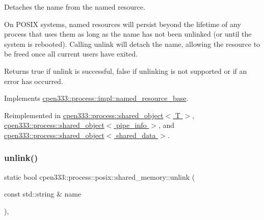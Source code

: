 Detaches the name from the named resource. 

On P\+O\+S\+IX systems, named resources will persist beyond the lifetime of any process that uses them as long as the name has not been unlinked (or until the system is rebooted). Calling {\ttfamily unlink} will detach the name, allowing the resource to be freed once all current users have exited.

\begin{DoxyReturn}{Returns}
{\ttfamily true} if unlink is successful, {\ttfamily false} if unlinking is not supported or if an error has occurred. 
\end{DoxyReturn}


Implements \hyperlink{classcpen333_1_1process_1_1impl_1_1named__resource__base_ae4033f82dfd068b917a9bca57d3a0c45}{cpen333\+::process\+::impl\+::named\+\_\+resource\+\_\+base}.



Reimplemented in \hyperlink{classcpen333_1_1process_1_1shared__object_aa5b43829da5bd2376927e6285745211c}{cpen333\+::process\+::shared\+\_\+object$<$ T $>$}, \hyperlink{classcpen333_1_1process_1_1shared__object_aa5b43829da5bd2376927e6285745211c}{cpen333\+::process\+::shared\+\_\+object$<$ pipe\+\_\+info $>$}, and \hyperlink{classcpen333_1_1process_1_1shared__object_aa5b43829da5bd2376927e6285745211c}{cpen333\+::process\+::shared\+\_\+object$<$ shared\+\_\+data $>$}.

\mbox{\label{classcpen333_1_1process_1_1posix_1_1shared__memory_a68a9ecfafed3c939bc9c38edee71d584}} 
\subsubsection{\texorpdfstring{unlink()}{unlink()}\hspace{0.1cm}{\footnotesize\ttfamily [2/2]}}
{\footnotesize\ttfamily static bool cpen333\+::process\+::posix\+::shared\+\_\+memory\+::unlink (\begin{DoxyParamCaption}\item[{const std\+::string \&}]{name }\end{DoxyParamCaption})\hspace{0.3cm}{\ttfamily [inline]}, {\ttfamily [static]}}




